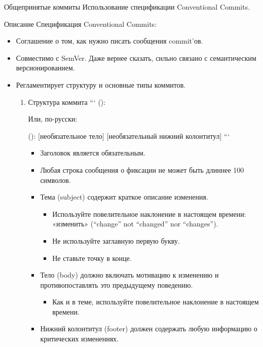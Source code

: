 \documentclass[
  ignorenonframetext,
  aspectratio=169,
  russian,
]{beamer}
\providecommand{\tightlist}{%
  \setlength{\itemsep}{0pt}\setlength{\parskip}{0pt}}
\begin{document}
\begin{frame}[fragile]{Общепринятые коммиты}
\protect{}\label{ux43eux431ux449ux435ux43fux440ux438ux43dux44fux442ux44bux435-ux43aux43eux43cux43cux438ux442ux44b}
Использование спецификации Conventional Commits.

\begin{block}{Описание}
\protect{}\label{ux43eux43fux438ux441ux430ux43dux438ux435}
Спецификация Conventional Commits:

\begin{itemize}[<+->]
\item
  Соглашение о том, как нужно писать сообщения commit'ов.
\item
  Совместимо с SemVer. Даже вернее сказать, сильно связано с
  семантическим версионированием.
\item
  Регламентирует структуру и основные типы коммитов.

  \begin{enumerate}[<+->]
  \item
    Структура коммита ``` ():

    Или, по-русски:

    (): {[}необязательное тело{]} {[}необязательный нижний колонтитул{]}
    ```

    \begin{itemize}[<+->]
    \tightlist
    \item
      Заголовок является обязательным.
    \item
      Любая строка сообщения о фиксации не может быть длиннее 100
      символов.
    \item
      Тема (subject) содержит краткое описание изменения.

      \begin{itemize}[<+->]
      \tightlist
      \item
        Используйте повелительное наклонение в настоящем времени:
        «изменить» (\enquote{change} not \enquote{changed} nor
        \enquote{changes}).
      \item
        Не используйте заглавную первую букву.
      \item
        Не ставьте точку в конце.
      \end{itemize}
    \item
      Тело (body) должно включать мотивацию к изменению и
      противопоставлять это предыдущему поведению.

      \begin{itemize}[<+->]
      \tightlist
      \item
        Как и в теме, используйте повелительное наклонение в настоящем
        времени.
      \end{itemize}
    \item
      Нижний колонтитул (footer) должен содержать любую информацию о
      критических изменениях.


\end{itemize}
\end{enumerate}
\end{itemize}
\end{block}
\end{frame}
\end{document}
